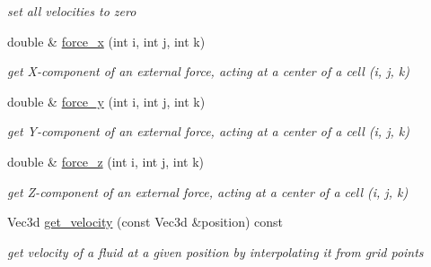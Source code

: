 \begin{DoxyCompactItemize}
\begin{DoxyCompactList}\small\item\em set all velocities to zero \end{DoxyCompactList}\item 
\hypertarget{class_fluid_sim_a1f7b3c74cecf8ac32d93f468b6eaef12}{}double \& \hyperlink{class_fluid_sim_a1f7b3c74cecf8ac32d93f468b6eaef12}{force\+\_\+x} (int i, int j, int k)\label{class_fluid_sim_a1f7b3c74cecf8ac32d93f468b6eaef12}

\begin{DoxyCompactList}\small\item\em get X-\/component of an external force, acting at a center of a cell (i, j, k) \end{DoxyCompactList}\item 
\hypertarget{class_fluid_sim_a782b8e8e41e4d5a785188ebb7e2e548c}{}double \& \hyperlink{class_fluid_sim_a782b8e8e41e4d5a785188ebb7e2e548c}{force\+\_\+y} (int i, int j, int k)\label{class_fluid_sim_a782b8e8e41e4d5a785188ebb7e2e548c}

\begin{DoxyCompactList}\small\item\em get Y-\/component of an external force, acting at a center of a cell (i, j, k) \end{DoxyCompactList}\item 
\hypertarget{class_fluid_sim_ad07b83c5ec3f1667091d038dfc1a28a5}{}double \& \hyperlink{class_fluid_sim_ad07b83c5ec3f1667091d038dfc1a28a5}{force\+\_\+z} (int i, int j, int k)\label{class_fluid_sim_ad07b83c5ec3f1667091d038dfc1a28a5}

\begin{DoxyCompactList}\small\item\em get Z-\/component of an external force, acting at a center of a cell (i, j, k) \end{DoxyCompactList}\item 
\hypertarget{class_fluid_sim_a84311b3d42a051b865cf3a0f658275de}{}Vec3d \hyperlink{class_fluid_sim_a84311b3d42a051b865cf3a0f658275de}{get\+\_\+velocity} (const Vec3d \&position) const \label{class_fluid_sim_a84311b3d42a051b865cf3a0f658275de}

\begin{DoxyCompactList}\small\item\em get velocity of a fluid at a given position by interpolating it from grid points \end{DoxyCompactList}\end{DoxyCompactItemize}


